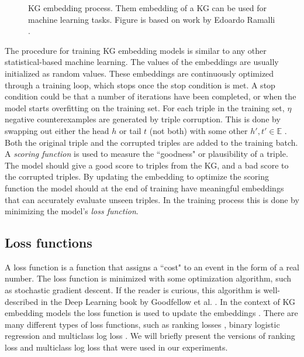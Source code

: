 \begin{figure}[htp]
    \centering
    
    \caption[KG embedding process.]{KG embedding process. Them embedding of a KG can be used for machine learning tasks. Figure is based on work by Edoardo Ramalli \cite{wiki_KG_embedding}.}
    \label{KG_embdding_diag}
\end{figure}

The procedure for training KG embedding models is similar to any other statistical-based machine learning. The values of the embeddings are usually initialized as random values. These embeddings are continuously optimized through a training loop, which stops once the stop condition is met. A stop condition could be that a number of iterations have been completed, or when the model starts overfitting on the training set. For each triple in the training set, $\eta$ negative counterexamples are generated by triple corruption. This is done by swapping out either the head $h$ or tail $t$ (not both) with some other $h', t' \in \mathbb{E}$ \cite{TransE}. Both the original triple and the corrupted triples are added to the training batch. A \textit{scoring function} is used to measure the ``goodness" or plausibility of a triple. The model should give a good score to triples from the KG, and a bad score to the corrupted triples. By updating the embedding to optimize the scoring function the model should at the end of training have meaningful embeddings that can accurately evaluate unseen triples. In the training process this is done by minimizing the model's \textit{loss function}.

\subsection{Loss functions}
A loss function is a function that assigns a ``cost" to an event in the form of a real number. The loss function is minimized with some optimization algorithm, such as stochastic gradient descent. If the reader is curious, this algorithm is well-described in the Deep Learning book by Goodfellow et al. \cite[p. 149]{goodfellow}. In the context of KG embedding models the loss function is used to update the embeddings \cite{dai2020survey}. There are many different types of loss functions, such as ranking losses \cite{TransE}, binary logistic regression \cite{complEx} and multiclass log loss \cite{kadlec2017knowledge}. We will briefly present the versions of ranking loss and multiclass log loss that were used in our experiments.

